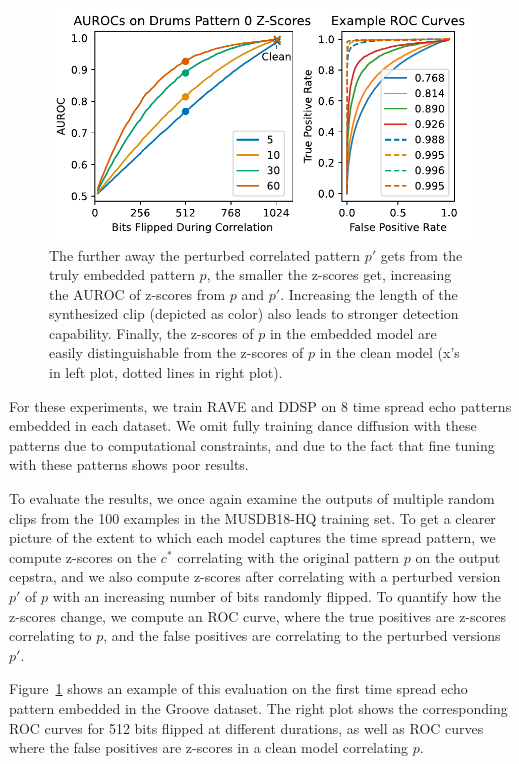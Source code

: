 \documentclass[letterpaper]{article} %
\begin{document}
\begin{figure}
    \centering
    \includegraphics[width=\columnwidth]{figs/DrumsPNModel_pn0.pdf}
    \caption{The further away the perturbed correlated pattern $p'$ gets from the truly embedded pattern $p$, the smaller the z-scores get, increasing the AUROC of z-scores from $p$ and $p'$.  Increasing the length of the synthesized clip (depicted as color) also leads to stronger detection capability.  Finally, the z-scores of $p$ in the embedded model are easily distinguishable from the z-scores of $p$ in the clean model (x's in left plot, dotted lines in right plot).}
    \label{fig:drumspn7}
\end{figure}

For these experiments, we train RAVE and DDSP on 8 time spread echo patterns embedded in each dataset.  We omit fully training dance diffusion with these patterns due to computational constraints, and due to the fact that fine tuning with these patterns shows poor results.

To evaluate the results, we once again examine the outputs of multiple random clips from the 100 examples in the MUSDB18-HQ training set.  To get a clearer picture of the extent to which each model captures the time spread pattern, we compute z-scores on the $c^*$ correlating with the original pattern $p$ on the output cepstra, and we also compute z-scores after correlating with a perturbed version $p'$ of $p$ with an increasing number of bits randomly flipped.  To quantify how the z-scores change, we compute an ROC curve, where the true positives are z-scores correlating to $p$, and the false positives are correlating to the perturbed versions $p'$.  

Figure~\ref{fig:drumspn7} shows an example of this evaluation on the first time spread echo pattern embedded in the Groove dataset.  The right plot shows the corresponding ROC curves for 512 bits flipped at different durations, as well as ROC curves where the false positives are z-scores in a clean model correlating $p$.
\end{document}
